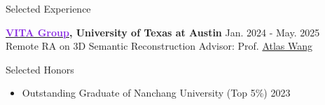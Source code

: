 \documentclass{resume} %
\begin{document}
\begin{rSection}{Selected Experience}

\vspace{-0.5mm}

{ {\bf \href{https://vita-group.github.io/group.html}{\textcolor{BlueViolet}{VITA Group}}, University of Texas at Austin}} \hfill  Jan. 2024 - May. 2025
\\Remote RA on 3D Semantic Reconstruction \hfill Advisor: Prof. {\color{BlueViolet} \href{https://vita-group.github.io/group.html}{Atlas Wang}}

\end{rSection}

\vspace{-0.5mm}
\begin{rSection}{Selected  Honors}
\vspace{-1mm}
\begin{itemize}[leftmargin=1.5em]
    \item \small Outstanding Graduate of Nanchang University (Top 5\%) \hfill 2023
\end{itemize}
\end{rSection}
\end{document}
